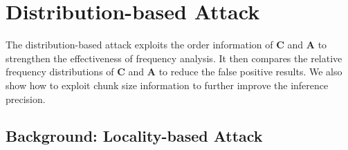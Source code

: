 \documentclass[bachelor]{thesis-uestc}
\begin{document}








\chapter{Distribution-based Attack}
\label{sec:distribution-attack}

The distribution-based attack exploits the order information of $\mathbf{C}$
and $\mathbf{A}$ to strengthen the effectiveness of frequency analysis.  It
then compares the relative frequency distributions of $\mathbf{C}$ and
$\mathbf{A}$ to reduce the false positive results.  We also show how to
exploit chunk size information to further improve the inference precision.  

\section{Background: Locality-based Attack}
\label{sec:prior-attack}
\end{document}
